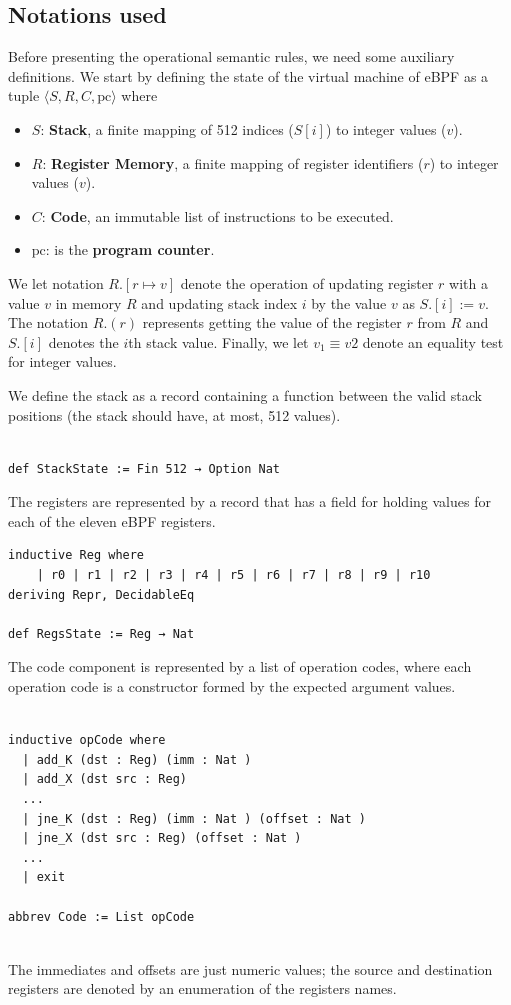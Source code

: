 \documentclass[sigconf]{acmart}
\begin{document}
\subsection{Notations used}

Before presenting the operational semantic rules, we need some auxiliary definitions.
We start by defining the state of the virtual machine of eBPF as a tuple 
$\langle S,R,C,\mathrm{pc}\rangle$ where 
\begin{itemize}
    \item $S$: \textbf{Stack}, a finite mapping of 512 indices ($S[i]$) to integer values ($v$).
    \item $R$: \textbf{Register Memory}, a finite mapping of register identifiers ($r$) to integer values ($v$).
    \item $C$: \textbf{Code}, an immutable list of instructions to be executed.
    \item $\mathrm{pc}$: is the \textbf{program counter}.
\end{itemize}
We let notation $R.[r \mapsto v]$ denote the operation of updating register $r$ with a value $v$ in memory $R$ and updating stack index $i$ by the value $v$ as $S.[i] := v$. 
The notation $R.(r)$ represents getting the value of the register $r$ from $R$ and $S.[i]$ denotes the $i$th stack value. Finally, we let $v_1 \equiv v2$ denote an equality test for integer values.

We define the stack as a record containing a function between the valid stack positions (the stack should have, at most, 512 values).
\begin{verbatim}

def StackState := Fin 512 → Option Nat

\end{verbatim}

The registers are represented by a record that has a field for holding values for each of the eleven eBPF registers.
\begin{verbatim}
inductive Reg where 
    | r0 | r1 | r2 | r3 | r4 | r5 | r6 | r7 | r8 | r9 | r10
deriving Repr, DecidableEq

def RegsState := Reg → Nat
\end{verbatim}

The code component is represented by a list of operation codes, where each operation code is a constructor formed by the expected argument values.
\begin{verbatim}

inductive opCode where
  | add_K (dst : Reg) (imm : Nat )
  | add_X (dst src : Reg)
  ...
  | jne_K (dst : Reg) (imm : Nat ) (offset : Nat )
  | jne_X (dst src : Reg) (offset : Nat )
  ...
  | exit

abbrev Code := List opCode
  
\end{verbatim}
The immediates and offsets are just numeric values; the source and destination registers are denoted by an enumeration of the registers names.
\end{document}
